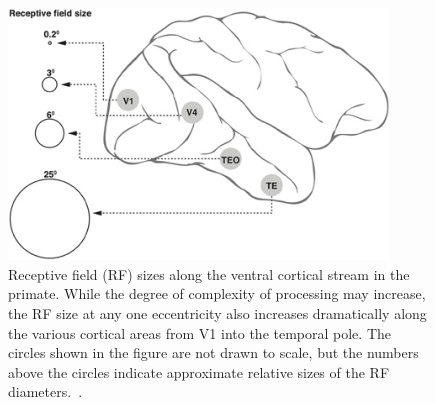 \begin{figure}[h!]
	\centering
	\includegraphics[width=0.9\textwidth]{pics/rf.jpg}
	\caption{Receptive field (RF) sizes along the ventral cortical stream in the primate. While the degree of complexity of processing may increase, the RF size at any one eccentricity also increases dramatically along the various cortical areas from V1 into the temporal pole. The circles shown in the figure are not drawn to scale, but the numbers above the circles indicate approximate relative sizes of the RF diameters.~\cite{vidyasagar2013reading}.}
	\label{Fig:Hir1}
\end{figure}

%
%

